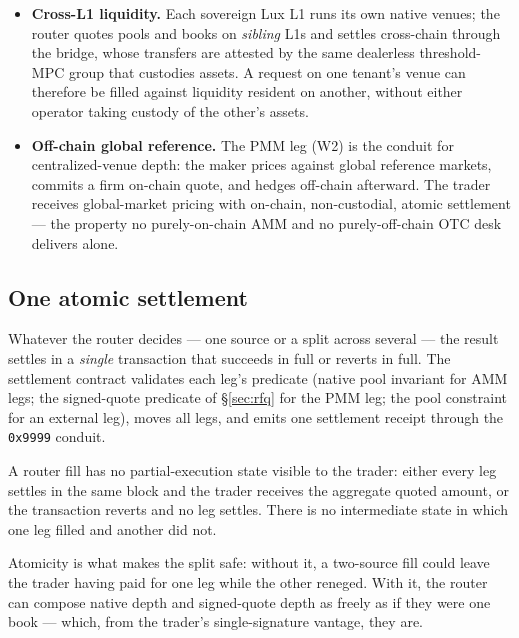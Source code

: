 \begin{itemize}[leftmargin=1.4em]
  \item \textbf{Cross-L1 liquidity.} Each sovereign Lux L1 runs its own
  native venues; the router quotes pools and books on \emph{sibling} L1s
  and settles cross-chain through the bridge, whose transfers are attested
  by the same dealerless threshold-MPC group that custodies assets. A
  request on one tenant's venue can therefore be filled against liquidity
  resident on another, without either operator taking custody of the other's
  assets.
  \item \textbf{Off-chain global reference.} The PMM leg (W2) is the
  conduit for centralized-venue depth: the maker prices against global
  reference markets, commits a firm on-chain quote, and hedges off-chain
  afterward. The trader receives global-market pricing with on-chain,
  non-custodial, atomic settlement --- the property no purely-on-chain AMM
  and no purely-off-chain OTC desk delivers alone.
\end{itemize}

\subsection{One atomic settlement}
\label{sec:router-atomic}

Whatever the router decides --- one source or a split across several --- the
result settles in a \emph{single} transaction that succeeds in full or
reverts in full. The settlement contract validates each leg's predicate
(native pool invariant for AMM legs; the signed-quote predicate of
\S\ref{sec:rfq} for the PMM leg; the pool constraint for an external leg),
moves all legs, and emits one settlement receipt through the
\texttt{0x9999} conduit.

\begin{property}
A router fill has no partial-execution state visible to the trader: either
every leg settles in the same block and the trader receives the aggregate
quoted amount, or the transaction reverts and no leg settles. There is no
intermediate state in which one leg filled and another did not.
\end{property}

Atomicity is what makes the split safe: without it, a two-source fill could
leave the trader having paid for one leg while the other reneged. With it,
the router can compose native depth and signed-quote depth as freely as if
they were one book --- which, from the trader's single-signature vantage,
they are.


